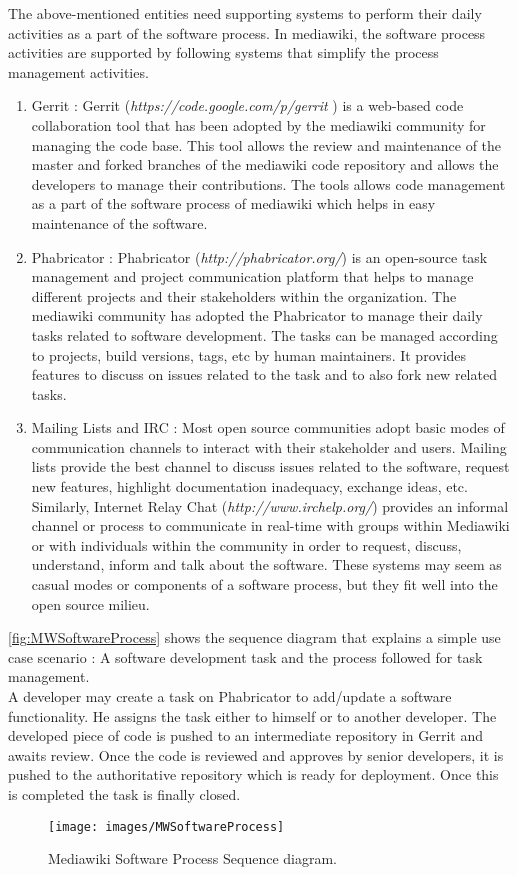 \indent The above-mentioned entities need supporting systems to perform their daily activities as a part of the software process. In mediawiki, the software process activities are supported by following systems that simplify the process management  activities. 
\begin{enumerate}
\item Gerrit : Gerrit (\emph{https://code.google.com/p/gerrit }) is a web-based code collaboration tool that has been adopted by the mediawiki community for managing the code base. This tool allows the review and maintenance of the master and forked branches of the mediawiki code repository and allows the developers to manage their contributions. The tools allows code management as a part of the software process of mediawiki which helps in easy maintenance of the software. 
\item Phabricator : Phabricator (\emph{http://phabricator.org/}) is an open-source task management and project communication platform that helps to manage different projects and their stakeholders within the organization. The mediawiki community has adopted the Phabricator to manage their daily tasks related to software development. The tasks can be managed according to projects, build versions, tags, etc by human maintainers. It provides features to discuss on issues related to the task and to also fork new related tasks.
\item Mailing Lists and IRC : Most open source communities adopt basic modes of communication channels to interact with their stakeholder and users. Mailing lists provide the best channel to discuss issues related to the software, request new features, highlight documentation inadequacy, exchange ideas, etc. Similarly, Internet Relay Chat (\emph{http://www.irchelp.org/}) provides an informal channel or process to communicate in real-time with groups within Mediawiki or with individuals within the community in order to request, discuss, understand, inform and talk about the software. 
\newline These systems may seem as casual modes or components of a software process, but they fit well into the open source milieu.
\end{enumerate}
\indent \autoref{fig:MWSoftwareProcess}  shows the sequence diagram that explains a simple use case scenario : A software development task and the process followed for task management. 
\\\indent A developer may create a task on Phabricator to add/update a software functionality. He assigns the task either to himself or to another developer. The developed piece of code is pushed to an intermediate repository in Gerrit and awaits review. Once the code is reviewed and approves by senior developers, it is pushed to the authoritative repository which is ready for deployment. Once this is completed the task is finally closed.  
\begin{figure}[H]
  \centering
  \texttt{[image: images/MWSoftwareProcess]}
  \caption[Current software maintenace process Sequence diagram]{Mediawiki Software Process Sequence diagram.}\label{fig:MWSoftwareProcess}
\end{figure}
